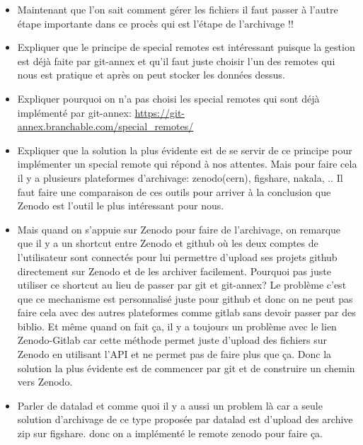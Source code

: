 \documentclass[11pt]{article}
\begin{document}
\begin{enumerate}
\begin{itemize}
\item Maintenant que l'on sait comment gérer les fichiers il faut
passer à l'autre étape importante dans ce procès qui est l'étape
de l'archivage !!
\end{itemize}
\begin{itemize}
\item Expliquer que le principe de special remotes est intéressant
puisque la gestion est déjà faite par git-annex et qu'il faut
juste choisir l'un des remotes qui nous est pratique et après on
peut stocker les données dessus.
\item Expliquer pourquoi on n'a pas choisi les special remotes qui
sont déjà implémenté par git-annex:
\url{https://git-annex.branchable.com/special\_remotes/}
\item Expliquer que la solution la plus évidente est de se servir de
ce principe pour implémenter un special remote qui répond à nos
attentes. Mais pour faire cela il y a plusieurs plateformes
d'archivage: zenodo(cern), figshare, nakala, .. Il faut faire une
comparaison de ces outils pour arriver à la conclusion que
Zenodo est l'outil le plus intéressant pour nous.
\item Mais quand on s'appuie sur Zenodo pour faire de l'archivage, on
remarque que il y a un shortcut entre Zenodo et github où les deux
comptes de l'utilisateur sont connectés pour lui permettre
d'upload ses projets github directement sur Zenodo et de les
archiver facilement. Pourquoi pas juste utiliser ce shortcut au
lieu de passer par git et git-annex? Le problème c'est que ce
mechanisme est personnalisé juste pour github et donc on ne peut
pas faire cela avec des autres plateformes comme gitlab sans
devoir passer par des biblio. Et même quand on fait ça, il y a
toujours un problème avec le lien Zenodo-Gitlab car cette
méthode permet juste d'upload des fichiers sur Zenodo en
utilisant l'API et ne permet pas de faire plus que ça. Donc la
solution la plus évidente est de commencer par git et de
construire un chemin vers Zenodo.
\item Parler de datalad et comme quoi il y a aussi un problem là car a
seule solution d'archivage de ce type proposée par datalad est
d'upload des archive zip sur figshare. donc on a implémenté le
remote zenodo pour faire ça.
\end{itemize}


\end{enumerate}
\end{document}
